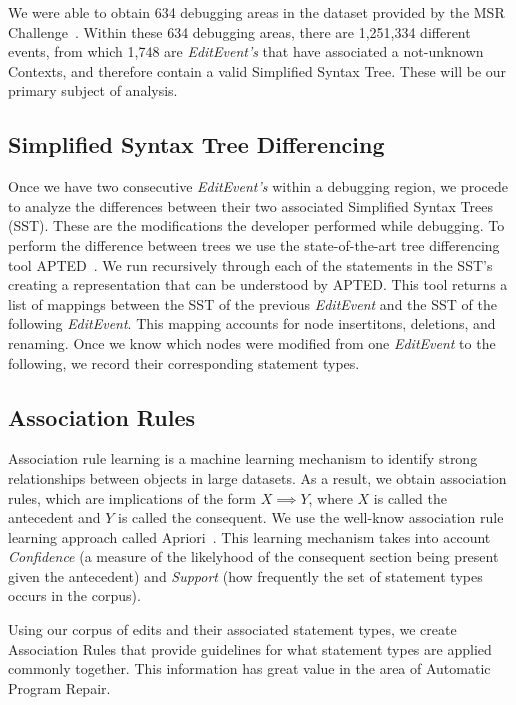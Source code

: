 \documentclass[sigconf]{acmart}
\begin{document}
We were able to obtain 634 debugging areas in the dataset 
provided by the MSR Challenge~\cite{msr18challenge}.
Within these 634 debugging areas, there are 1,251,334
different events, from which 1,748 are \textit{EditEvent's}
that have associated a not-unknown Contexts, and therefore 
contain a valid Simplified Syntax Tree. These will be 
our primary subject of analysis.

\subsection{Simplified Syntax Tree Differencing}
Once we have two consecutive \textit{EditEvent's} within
a debugging region, we procede to analyze the differences
between their two associated Simplified Syntax Trees (SST).
These are the modifications the developer performed
while debugging.
To perform the difference between trees we use the 
state-of-the-art tree differencing
tool APTED~\cite{Pawlik16Apted}.
We run recursively through each of the statements in the 
SST's creating a representation that can be understood by
APTED. This tool returns a list of mappings between
the SST of the previous \textit{EditEvent} and the SST
of the following \textit{EditEvent}. This mapping
accounts for node insertitons, deletions, and renaming.
Once we know which nodes were modified from one \textit{EditEvent}
to the following, we record their corresponding statement types.

\subsection{Association Rules}
Association rule learning is a machine learning mechanism to identify
strong relationships between objects in large datasets. 
As a result, we obtain association rules, which are implications of the
form $X \implies Y$, where $X$ is called the antecedent and 
$Y$ is called the consequent.
We use the well-know association rule learning approach called 
Apriori~\cite{Agrawal94}. This learning mechanism takes into 
account \textit{Confidence} (a measure of the likelyhood 
of the consequent section being present given the 
antecedent) and \textit{Support} (how frequently the set of
statement types occurs in the corpus).

Using our corpus of edits and their associated statement types, 
we create Association Rules that provide guidelines
for what statement types are applied commonly together. This
information has great value in the area of Automatic 
Program Repair.
\end{document}
